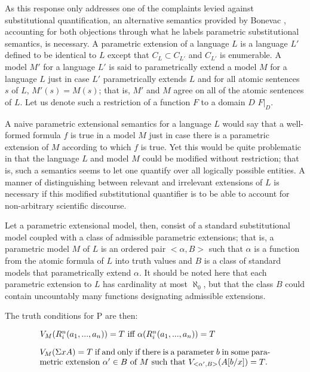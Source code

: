 \documentclass[12pt,a4paper]{article}
\newenvironment{te}
{\begin{singlespace}
\begin{equation}
\begin{minipage}[t]{0.8\linewidth}}
{\end{minipage}
\end{equation}
\end{singlespace}
\ignorespacesafterend}
\begin{document}
As this response only addresses one of the complaints levied against
substitutional quantification, an alternative semantics provided by
Bonevac \cite{bonevac84}, accounting for both objections through what
he labels parametric substitutional semantics, is necessary.  A
parametric extension of a language $L$ is a language $L'$ defined to
be identical to $L$ except that $C_L \subset C_{L'}$ and $C_{L'}$ is
enumerable.  A model $M'$ for a language $L'$ is said to
parametrically extend a model $M$ for a language $L$ just in case $L'$
parametrically extends $L$ and for all atomic sentences $s$ of $L$,
$M'(s) = M(s)$; that is, $M'$ and $M$ agree on all of the atomic
sentences of $L$.  Let us denote such a restriction of a function $F$ to
a domain $D$ $F |_D$.

A naive parametric extensional semantics for a language $L$ would say
that a well-formed formula $f$ is true in a model $M$ just in case
there is a parametric extension of $M$ according to which $f$ is
true. Yet this would be quite problematic in that the language $L$ and
model $M$ could be modified without restriction; that is, such a
semantics seems to let one quantify over all logically possible
entities.  A manner of distinguishing between relevant and irrelevant
extensions of $L$ is necessary if this modified substitutional
quantifier is to be able to account for non-arbitrary scientific
discourse.

Let a parametric extensional model, then, consist of a standard
substitutional model coupled with a class of admissible parametric
extensions; that is, a parametric model $M$ of $L$ is an ordered pair
$<\alpha, B>$ such that $\alpha$ is a function from the atomic formula
of $L$ into truth values and $B$ is a class of standard models that
parametrically extend $\alpha$.  It should be noted here that each
parametric extension to $L$ has cardinality at most $\aleph_0$, but
that the class $B$ could contain uncountably many functions
designating admissible extensions.

The truth conditions for P are then:
\begin{te}
$V_M(R^n_i(a_1,...,a_n)) = T \text{ iff } \alpha(R^n_i(a_1,...,a_n)) = T$
\end{te}
\begin{te}
  $V_M(\Sigma xA) = T$ if and only if there is a parameter $b$ in some
  parametric extension $\alpha' \in B$ of $M$ such that
  $V_{<\alpha', B>}(A[b/x]) = T$.\\
  \label{ext}
\end{te} 
\end{document}
